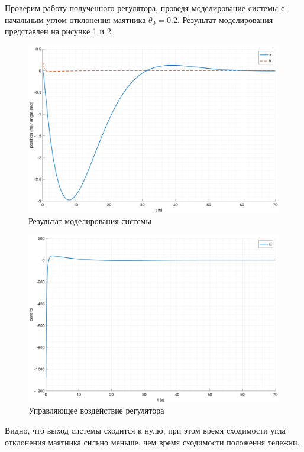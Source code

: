 Проверим работу полученного регулятора, проведя моделирование системы с начальным углом 
отклонения маятника $\theta_0 = 0.2$. Результат моделирования представлен на рисунке \ref{fig:lqr_controller} и 
\ref{fig:lqr_controller_u} 
\begin{figure}[ht!]
    \centering
    \includegraphics[width=\textwidth]{media/plots/LQR/out_1.png}
    \caption{Результат моделирования системы}
    \label{fig:lqr_controller}
\end{figure}
\begin{figure}[ht!]
    \centering
    \includegraphics[width=\textwidth]{media/plots/LQR/u_1.png}
    \caption{Управляющее воздействие регулятора}
    \label{fig:lqr_controller_u}
\end{figure}
Видно, что выход системы сходится к нулю, при этом время сходимости угла отклонения маятника сильно 
меньше, чем время сходимости положения тележки. 

